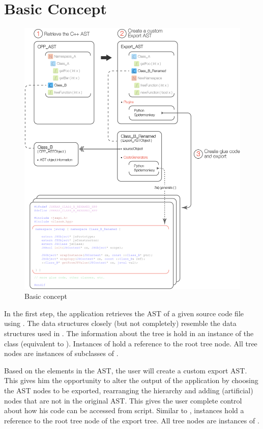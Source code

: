 \newpage
\section{Basic Concept}
\label{sec:BasicConcept}

\begin{figure}[h] %
	\centering
		\includegraphics[scale=0.35]{Images/GUIApp_Concept.jpg}
	\caption{Basic concept}
	\label{fig:GUIAppConcept}
\end{figure}

In the first step, the application retrieves the  AST of a given source code file using . The data structures closely (but not completely) resemble the data structures used in . The information about the tree is hold in an instance of the  class  (equivalent to ). Instances of  hold a reference to the root tree node. All tree nodes are instances of subclasses of .

Based on the elements in the  AST, the user will create a custom export AST. This gives him the opportunity to alter the output of the application by choosing the AST nodes to be exported, rearranging the hierarchy and adding (artificial) nodes that are not in the original  AST. This gives the user complete control about how his  code can be accessed from script. Similar to ,  instances hold a reference to the root tree node of the export tree. All tree nodes are instances of .

